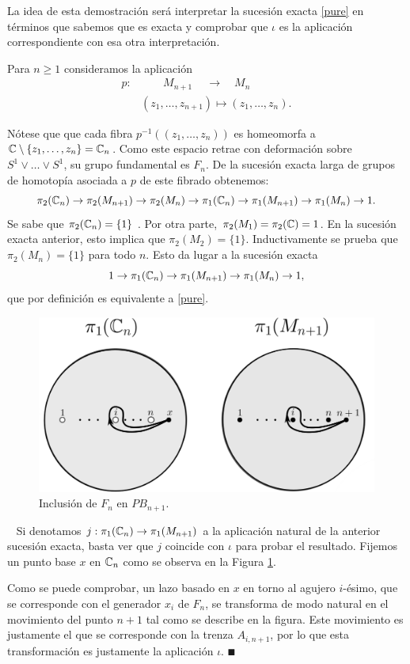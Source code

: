 \documentclass[TFG.tex]{subfiles}
\begin{document}
\begin{dem}
La idea de esta demostración será interpretar la sucesión exacta \ref{pure} en términos que sabemos que es exacta y comprobar que $\iota$ es la aplicación correspondiente con esa otra interpretación.

Para $n\geq 1$ consideramos la aplicación
\begin{align}\label{fibrado}
p: & \qquad M_{n+1}\ \quad \longrightarrow\quad M_n\\
&(z_1,\dots,z_{n+1})\mapsto (z_1,\dots,z_n).\nonumber
\end{align} 

Nótese que que cada fibra $p^{-1}((z_1,\dots, z_n))$ es homeomorfa a $\mathbb{C}\setminus\{z_1,\dots, z_n\}=\mathbb{C}_n$. Como este espacio retrae con deformación sobre $S^1\lor\dots\lor S^1$, su grupo fundamental es $F_n$. De la sucesión exacta larga de grupos de homotopía asociada a $p$ \cite{Hatcher} de este fibrado obtenemos:
$$\pi_2(\mathbb{C}_n)\to\pi_2(M_{n+1})\to\pi_2(M_n)\to\pi_1(\mathbb{C}_n)\to\pi_1(M_{n+1})\to\pi_1(M_n)\to 1.$$
Se sabe que $\pi_2(\mathbb{C}_n)=\{1\}$ \cite{Hatcher}. Por otra parte, $\pi_2(M_1)=\pi_2(\mathbb{C})={1}$. En la sucesión exacta anterior, esto implica que $\pi_2(M_2)=\{1\}$. Inductivamente se prueba que $\pi_2(M_n)=\{1\}$ para todo $n$. Esto da lugar a la sucesión exacta
$$1\to\pi_1(\mathbb{C}_n)\to\pi_1(M_{n+1})\to\pi_1(M_n)\to 1,$$
que por definición es equivalente a \ref{pure}. 


\begin{figure}[h!]\label{inclusion}
\includegraphics[scale=0.4]{Imagenes/inclusion.png}
\caption{Inclusión de $F_n$ en $PB_{n+1}$.}
\end{figure}\
Si denotamos $j:\pi_1(\mathbb{C}_n)\to\pi_1(M_{n+1})$ a la aplicación natural de la anterior sucesión exacta, basta ver que $j$ coincide con $\iota$ para probar el resultado. Fijemos un punto base $x$ en $\mathbb{C}_n$ como se observa en la Figura \ref{inclusion}.

Como se puede comprobar, un lazo basado en $x$ en torno al agujero $i$-ésimo, que se corresponde con el generador $x_i$ de $F_n$, se transforma de modo natural en el movimiento del punto $n+1$ tal como se describe en la figura. Este movimiento es justamente el que se corresponde con la trenza $A_{i,n+1}$, por lo que esta transformación es justamente la aplicación $\iota$. $\QED$
\end{dem}
\end{document}
